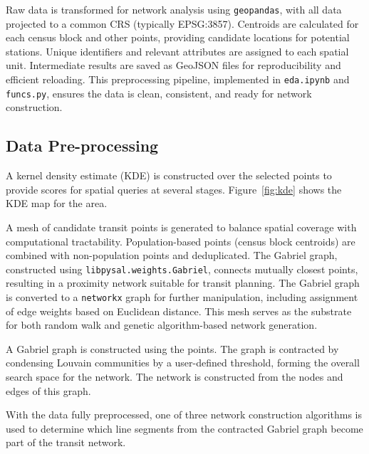 \documentclass[manuscript,nonacm]{acmart}
\begin{document}
Raw data is transformed for network analysis using \texttt{geopandas}, with all data projected to a common CRS (typically EPSG:3857). Centroids are calculated for each census block and other points, providing candidate locations for potential stations. Unique identifiers and relevant attributes are assigned to each spatial unit. Intermediate results are saved as GeoJSON files for reproducibility and efficient reloading. This preprocessing pipeline, implemented in \texttt{eda.ipynb} and \texttt{funcs.py}, ensures the data is clean, consistent, and ready for network construction.

\subsection{Data Pre-processing}

A kernel density estimate (KDE) is constructed over the selected points to provide scores for spatial queries at several stages. Figure~\ref{fig:kde} shows the KDE map for the area.

A mesh of candidate transit points is generated to balance spatial coverage with computational tractability. Population-based points (census block centroids) are combined with non-population points and deduplicated. The Gabriel graph, constructed using \texttt{libpysal.weights.Gabriel}, connects mutually closest points, resulting in a proximity network suitable for transit planning. The Gabriel graph is converted to a \texttt{networkx} graph for further manipulation, including assignment of edge weights based on Euclidean distance. This mesh serves as the substrate for both random walk and genetic algorithm-based network generation.

A Gabriel graph is constructed using the points. The graph is contracted by condensing Louvain communities by a user-defined threshold, forming the overall search space for the network. The network is constructed from the nodes and edges of this graph.

With the data fully preprocessed, one of three network construction algorithms is used to determine which line segments from the contracted Gabriel graph become part of the transit network.
\end{document}
